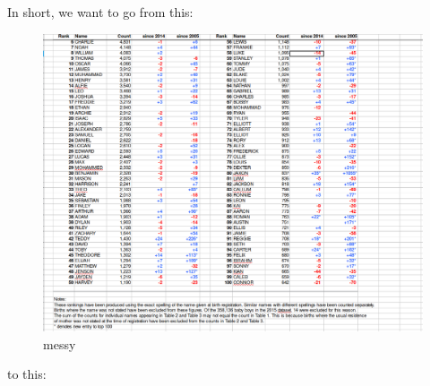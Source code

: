 \documentclass[]{book}
\begin{document}
In short, we want to go from this:

\begin{figure}
\centering
\includegraphics{R/RDataWrangling/images/messy.png}
\caption{messy}
\end{figure}

to this:
\end{document}

